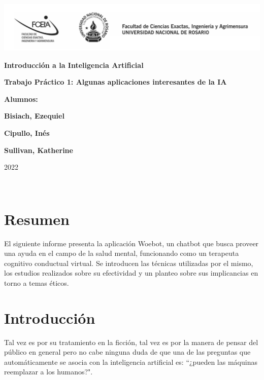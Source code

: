 \documentclass[11pt]{article}
\begin{document}
\begin{titlepage}
    \hspace{-2.5cm}\includegraphics[scale= 0.48]{header.png}
    \begin{center}
        \vfill
            \noindent\textbf{\Huge Introducción a la Inteligencia Artificial}\par
            \vspace{.5cm}
            \noindent\textbf{\Huge Trabajo Práctico 1: Algunas aplicaciones interesantes de la IA}\par
            \vspace{.5cm}
        \vfill
        \noindent \textbf{\huge Alumnos:}\par
        \vspace{.5cm}
        \noindent \textbf{\Large Bisiach, Ezequiel}\par
        \noindent \textbf{\Large Cipullo, Inés}\par
        \noindent \textbf{\Large Sullivan, Katherine}\par
 
        \vfill
        \noindent\large 2022
    \end{center}
\end{titlepage}
\ \par

\section*{Resumen}
El siguiente informe presenta la aplicación Woebot, un chatbot que busca
proveer una ayuda en el campo de la salud mental, funcionando como un terapeuta 
cognitivo conductual virtual. Se introducen las técnicas utilizadas por el mismo,
los estudios realizados sobre su efectividad y un planteo sobre sus implicancias 
en torno a temas éticos.

\section{Introducción}
Tal vez es por su tratamiento en la ficción, tal vez es 
por la manera de pensar del público en general pero no
cabe ninguna duda de que una de las preguntas que 
automáticamente se asocia con la inteligencia artificial
es: ``¿pueden las máquinas reemplazar a los humanos?". 
\end{document}
